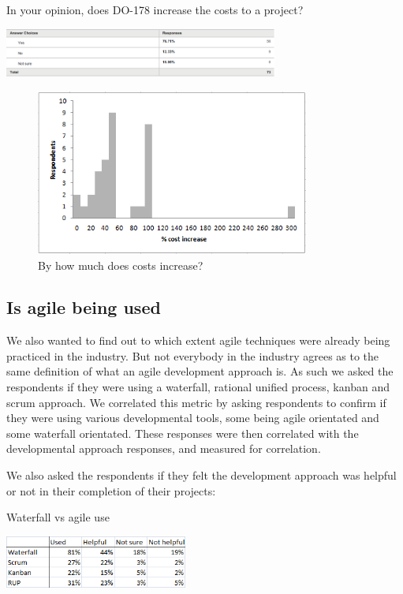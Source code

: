 \documentclass{sig-alternate-05-2015}
\begin{document}
\begin{table}[t!]
	\centering
	\caption{In your opinion, does DO-178 increase the costs to a project?}
	\includegraphics[width=90mm]{Does_increase_costs.png}
\end{table}

\begin{figure}[t!]
	\centering 
	\includegraphics[width=90mm]{Cost_histogram.png}
	\caption{By how much does costs increase?}
\end{figure}

\subsection{Is agile being used}
We also wanted to find out to which extent agile techniques were already being practiced in the industry. But not everybody in the industry agrees as to the same definition of what an agile development approach is. As such we asked the respondents if they were using a waterfall, rational unified process, kanban and scrum approach. We correlated this metric by asking respondents to confirm if they were using various developmental tools, some being agile orientated and some waterfall orientated. These responses were then correlated with the developmental approach responses, and measured for correlation. 

We also asked the respondents if they felt the development approach was helpful or not in their completion of their projects:

\begin{table}[t!]
	\centering
	\caption{Waterfall vs agile use}
	\includegraphics[width=60mm]{Agile_waterfall_uptake.png}
\end{table}
\end{document}
